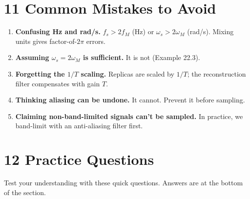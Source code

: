 \documentclass[11pt]{article}
\begin{document}
\section*{11 Common Mistakes to Avoid}

\begin{enumerate}
  \item \textbf{Confusing Hz and rad/s.} $f_s > 2f_M$ (Hz) or $\omega_s > 2\omega_M$ (rad/s). Mixing units gives factor-of-$2\pi$ errors.
  \item \textbf{Assuming $\omega_s = 2\omega_M$ is sufficient.} It is not (Example 22.3).
  \item \textbf{Forgetting the $1/T$ scaling.} Replicas are scaled by $1/T$; the reconstruction filter compensates with gain $T$.
  \item \textbf{Thinking aliasing can be undone.} It cannot. Prevent it before sampling.
  \item \textbf{Claiming non-band-limited signals can't be sampled.} In practice, we band-limit with an anti-aliasing filter first.
\end{enumerate}

\section*{12 Practice Questions}

Test your understanding with these quick questions. Answers are at the bottom of the section.
\end{document}
